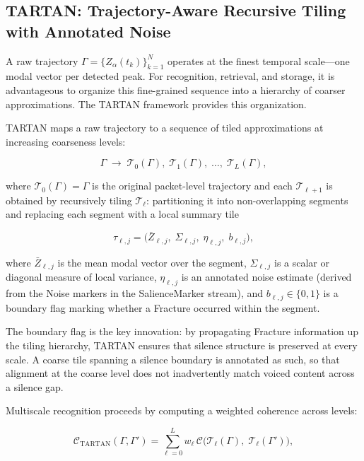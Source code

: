 \documentclass[12pt, a4paper]{article}
\begin{document}
\subsection{TARTAN: Trajectory-Aware Recursive Tiling with Annotated Noise}

A raw trajectory $\Gamma = \{Z_\alpha(t_k)\}_{k=1}^N$ operates at the finest temporal scale---one modal vector per detected peak. For recognition, retrieval, and storage, it is advantageous to organize this fine-grained sequence into a hierarchy of coarser approximations. The TARTAN framework provides this organization.

TARTAN maps a raw trajectory to a sequence of tiled approximations at increasing coarseness levels:

\begin{equation}
\Gamma \;\longrightarrow\; \mathcal{T}_0(\Gamma),\; \mathcal{T}_1(\Gamma),\; \ldots,\; \mathcal{T}_L(\Gamma),
\label{eq:tartan}
\end{equation}

where $\mathcal{T}_0(\Gamma) = \Gamma$ is the original packet-level trajectory and each $\mathcal{T}_{\ell+1}$ is obtained by recursively tiling $\mathcal{T}_\ell$: partitioning it into non-overlapping segments and replacing each segment with a local summary tile

\begin{equation}
\tau_{\ell,j} = \bigl(\bar{Z}_{\ell,j},\; \Sigma_{\ell,j},\; \eta_{\ell,j},\; b_{\ell,j}\bigr),
\label{eq:tile}
\end{equation}

where $\bar{Z}_{\ell,j}$ is the mean modal vector over the segment, $\Sigma_{\ell,j}$ is a scalar or diagonal measure of local variance, $\eta_{\ell,j}$ is an annotated noise estimate (derived from the Noise markers in the SalienceMarker stream), and $b_{\ell,j} \in \{0, 1\}$ is a boundary flag marking whether a Fracture occurred within the segment.

The boundary flag is the key innovation: by propagating Fracture information up the tiling hierarchy, TARTAN ensures that silence structure is preserved at every scale. A coarse tile spanning a silence boundary is annotated as such, so that alignment at the coarse level does not inadvertently match voiced content across a silence gap.

Multiscale recognition proceeds by computing a weighted coherence across levels:

\begin{equation}
\mathcal{C}_{\mathrm{TARTAN}}(\Gamma, \Gamma') = \sum_{\ell=0}^{L} w_\ell\, \mathcal{C}\bigl(\mathcal{T}_\ell(\Gamma),\; \mathcal{T}_\ell(\Gamma')\bigr),
\label{eq:Ctartan}
\end{equation}
\end{document}
